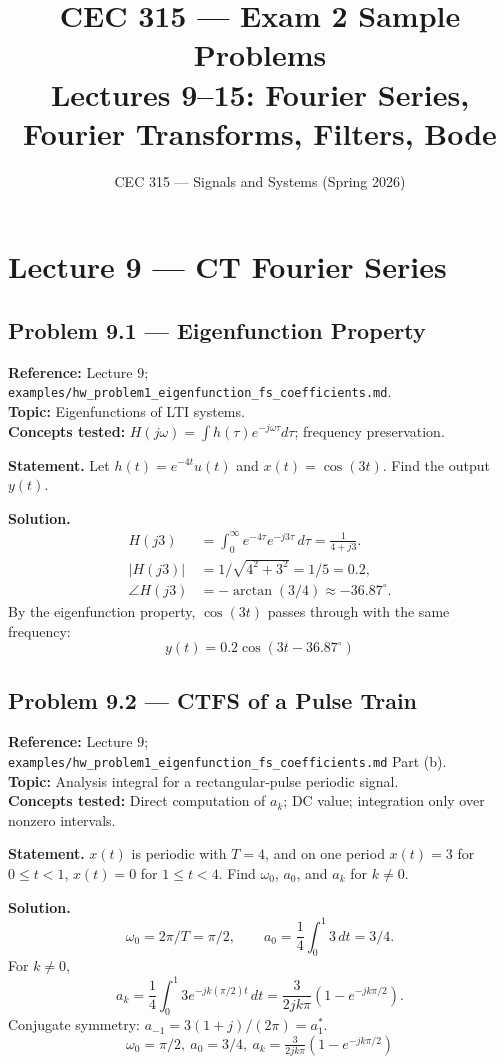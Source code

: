 \documentclass[11pt]{article}
\title{CEC 315 --- Exam 2 Sample Problems\\\large Lectures 9--15: Fourier Series, Fourier Transforms, Filters, Bode}
\author{CEC 315 --- Signals and Systems (Spring 2026)}
\date{}
\begin{document}
\maketitle
\tableofcontents
\newpage

\section{Lecture 9 --- CT Fourier Series}

\subsection{Problem 9.1 --- Eigenfunction Property}
\textbf{Reference:} Lecture 9; \texttt{examples/hw\_problem1\_eigenfunction\_fs\_coefficients.md}.\\
\textbf{Topic:} Eigenfunctions of LTI systems.\\
\textbf{Concepts tested:} $H(j\omega)=\int h(\tau)e^{-j\omega\tau}d\tau$; frequency preservation.

\textbf{Statement.} Let $h(t) = e^{-4t}u(t)$ and $x(t) = \cos(3t)$. Find the output $y(t)$.

\textbf{Solution.}
\begin{align*}
H(j3) &= \int_0^\infty e^{-4\tau}e^{-j3\tau}\,d\tau = \frac{1}{4+j3}.\\
|H(j3)| &= 1/\sqrt{4^2+3^2} = 1/5 = 0.2,\\
\angle H(j3) &= -\arctan(3/4)\approx -36.87^\circ.
\end{align*}
By the eigenfunction property, $\cos(3t)$ passes through with the same frequency:
\[
\boxed{\,y(t) = 0.2\cos(3t - 36.87^\circ)\,}
\]

\subsection{Problem 9.2 --- CTFS of a Pulse Train}
\textbf{Reference:} Lecture 9; \texttt{examples/hw\_problem1\_eigenfunction\_fs\_coefficients.md} Part (b).\\
\textbf{Topic:} Analysis integral for a rectangular-pulse periodic signal.\\
\textbf{Concepts tested:} Direct computation of $a_k$; DC value; integration only over nonzero intervals.

\textbf{Statement.} $x(t)$ is periodic with $T=4$, and on one period $x(t)=3$ for $0\le t<1$, $x(t)=0$ for $1\le t<4$. Find $\omega_0$, $a_0$, and $a_k$ for $k\ne 0$.

\textbf{Solution.}
\[
\omega_0 = 2\pi/T = \pi/2,\qquad a_0 = \frac{1}{4}\int_0^1 3\,dt = 3/4.
\]
For $k\ne 0$,
\[
a_k = \frac{1}{4}\int_0^1 3 e^{-jk(\pi/2)t}\,dt = \frac{3}{2jk\pi}\left(1 - e^{-jk\pi/2}\right).
\]
Conjugate symmetry: $a_{-1} = 3(1+j)/(2\pi) = a_1^*$.
\[
\boxed{\,\omega_0=\pi/2,\ a_0=3/4,\ a_k=\tfrac{3}{2jk\pi}(1-e^{-jk\pi/2})\,}
\]
\end{document}
